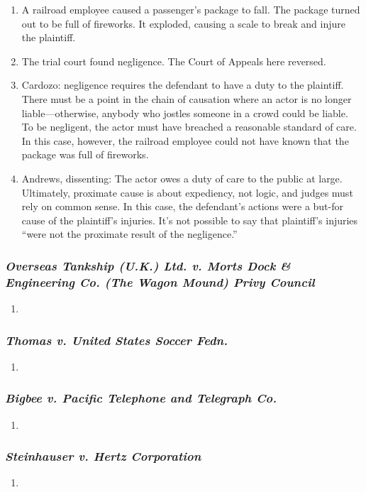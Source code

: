 \begin{enumerate}
    \item A railroad employee caused a passenger's package to fall. The package turned out to be full of fireworks. It exploded, causing a scale to break and injure the plaintiff.
    \item The trial court found negligence. The Court of Appeals here reversed.
    \item Cardozo: negligence requires the defendant to have a duty to the plaintiff. There must be a point in the chain of causation where an actor is no longer liable---otherwise, anybody who jostles someone in a crowd could be liable. To be negligent, the actor must have breached a reasonable standard of care. In this case, however, the railroad employee could not have known that the package was full of fireworks.
    \item Andrews, dissenting: The actor owes a duty of care to the public at large. Ultimately, proximate cause is about expediency, not logic, and judges must rely on common sense. In this case, the defendant's actions were a but-for cause of the plaintiff's injuries. It's not possible to say that plaintiff's injuries ``were not the proximate result of the negligence.''
\end{enumerate}

\subsubsection{\emph{Overseas Tankship (U.K.) Ltd. v. Morts Dock \& Engineering Co. (The Wagon Mound) Privy Council}}

\begin{enumerate}
    \item
\end{enumerate}

\subsubsection{\emph{Thomas v. United States Soccer Fedn.}}

\begin{enumerate}
    \item
\end{enumerate}

\subsubsection{\emph{Bigbee v. Pacific Telephone and Telegraph Co.}}

\begin{enumerate}
    \item
\end{enumerate}

\subsubsection{\emph{Steinhauser v. Hertz Corporation}}

\begin{enumerate}
    \item
\end{enumerate}
